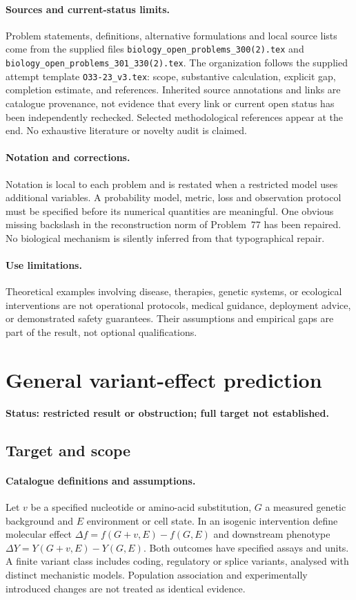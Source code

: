 \documentclass[11pt]{article}
\begin{document}
\paragraph{Sources and current-status limits.}
Problem statements, definitions, alternative formulations and local source lists
come from the supplied files
\texttt{biology\_open\_problems\_300(2).tex} and
\texttt{biology\_open\_problems\_301\_330(2).tex}.
The organization follows the supplied attempt template
\texttt{O33-23\_v3.tex}: scope, substantive calculation, explicit gap,
completion estimate, and references. Inherited source annotations and links are
catalogue provenance, not evidence that every link or current open status has
been independently rechecked. Selected methodological references appear at the
end. No exhaustive literature or novelty audit is claimed.

\paragraph{Notation and corrections.}
Notation is local to each problem and is restated when a restricted model uses
additional variables. A probability model, metric, loss and observation protocol
must be specified before its numerical quantities are meaningful. One obvious
missing backslash in the reconstruction norm of Problem~77 has been repaired.
No biological mechanism is silently inferred from that typographical repair.

\paragraph{Use limitations.}
Theoretical examples involving disease, therapies, genetic systems, or ecological
interventions are not operational protocols, medical guidance, deployment advice,
or demonstrated safety guarantees. Their assumptions and empirical gaps are part
of the result, not optional qualifications.


\section*{General variant-effect prediction}
\label{prob:063}
\noindent\textbf{Status: restricted result or obstruction; full target not established.}
\subsection{Target and scope}
\paragraph{Catalogue definitions and assumptions.}
Let $v$ be a specified nucleotide or amino-acid substitution, $G$ a measured genetic background and $E$ environment or cell state. In an isogenic intervention define molecular effect $\Delta f=f(G+v,E)-f(G,E)$ and downstream phenotype $\Delta Y=Y(G+v,E)-Y(G,E)$. Both outcomes have specified assays and units. A finite variant class includes coding, regulatory or splice variants, analysed with distinct mechanistic models. Population association and experimentally introduced changes are not treated as identical evidence.
\end{document}
